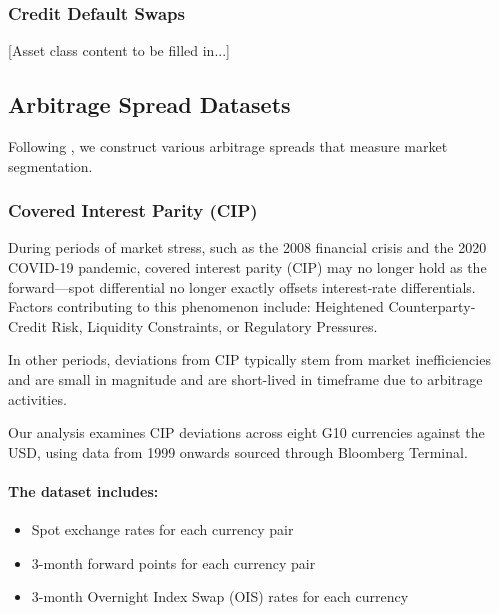 \documentclass{article}
\begin{document}
\begin{appendices}
\subsubsection{Credit Default Swaps}
\label{sec:cds}

[Asset class content to be filled in...]

\subsection{Arbitrage Spread Datasets}
\label{sec:arbitrage}


Following \cite{Siriwardane2021}, we construct various arbitrage spreads that measure market segmentation.

\subsubsection{Covered Interest Parity (CIP)}
     

During periods of market stress, such as the 2008 financial crisis and the 2020 COVID-19
pandemic, covered interest parity (CIP) may no longer hold as the forward---spot differential 
no longer exactly offsets interest‐rate differentials. Factors contributing to this phenomenon include:
Heightened Counterparty‐Credit Risk, Liquidity Constraints, or Regulatory Pressures.

In other periods, deviations from CIP typically stem from market inefficiencies and are 
small in magnitude and are short-lived in timeframe due to arbitrage activities.

Our analysis examines CIP deviations across eight G10 currencies against the USD, 
using data from 1999 onwards sourced through Bloomberg Terminal.

\paragraph{The dataset includes:}
\begin{itemize}
    \item Spot exchange rates for each currency pair
    \item 3-month forward points for each currency pair
    \item 3-month Overnight Index Swap (OIS) rates for each currency
\end{itemize}


\end{appendices}
\end{document}
